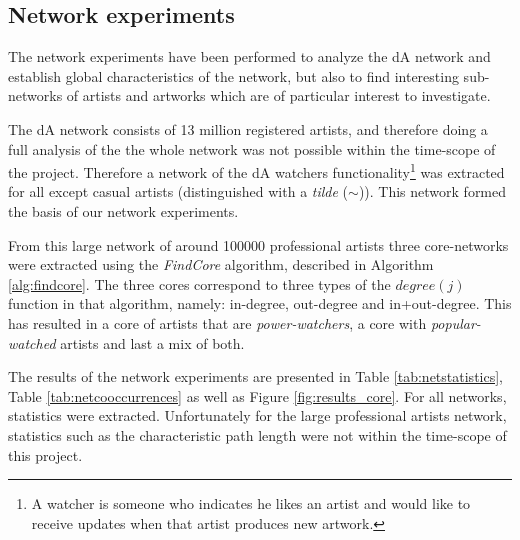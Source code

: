 \subsection{Network experiments}
The network experiments have been performed to analyze the dA network and establish global characteristics of the network, but also to find interesting sub-networks of artists and artworks which are of particular interest to investigate.

The dA network consists of 13 million registered artists, and therefore doing a full analysis of the the whole network was not possible within the time-scope of the project. Therefore a network of the dA watchers functionality\footnote{A watcher is someone who indicates he likes an artist and would like to receive updates when that artist produces new artwork.} was extracted for all except casual artists (distinguished with a \textit{tilde} ($\sim$)). This network formed the basis of our network experiments.

From this large network of around 100000 professional artists three core-networks were extracted using the \textit{FindCore} algorithm, described in Algorithm \ref{alg:findcore}. The three cores correspond to three types of the $degree(j)$ function in that algorithm, namely: in-degree, out-degree and in+out-degree. This has resulted in a core of artists that are \textit{power-watchers}, a core with \textit{popular-watched} artists and last a mix of both.

The results of the network experiments are presented in Table \ref{tab:netstatistics}, Table \ref{tab:netcooccurrences} as well as Figure \ref{fig:results_core}.  For all networks, statistics were extracted. Unfortunately for the large professional artists network, statistics such as the characteristic path length were not within the time-scope of this project.

